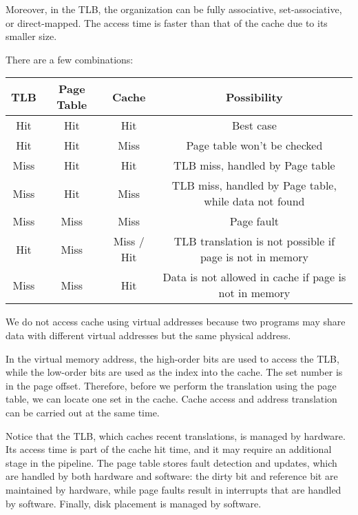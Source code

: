 Moreover, in the TLB, the organization can be fully associative, set-associative, or direct-mapped. The access time is faster than that of the cache due to its smaller size.

There are a few combinations: 

\begin{table}[H]
  \centering
  \begin{tabular}{c|c|c|c}
      \toprule
      TLB & Page Table & Cache & Possibility  \\
    \midrule
      Hit & Hit & Hit & Best case  \\
      Hit & Hit & Miss & Page table won't be checked  \\
      Miss & Hit & Hit & TLB miss, handled by Page table  \\
      Miss & Hit & Miss & TLB miss, handled by Page table, while data not found  \\
      Miss & Miss & Miss & Page fault  \\
      Hit & Miss & Miss / Hit & TLB translation is not possible if page is not in memory  \\
      Miss & Miss & Hit & Data is not allowed in cache if page is not in memory  \\
      \bottomrule
  \end{tabular}
\end{table}

\begin{remark}
  We do not access cache using virtual addresses because two programs may share data with different virtual addresses but the same physical address.
\end{remark}

In the virtual memory address, the high-order bits are used to access the TLB, while the low-order bits are used as the index into the cache. The set number is in the page offset. Therefore, before we perform the translation using the page table, we can locate one set in the cache. Cache access and address translation can be carried out at the same time.

Notice that the TLB, which caches recent translations, is managed by hardware. Its access time is part of the cache hit time, and it may require an additional stage in the pipeline. The page table stores fault detection and updates, which are handled by both hardware and software: the dirty bit and reference bit are maintained by hardware, while page faults result in interrupts that are handled by software. Finally, disk placement is managed by software.
